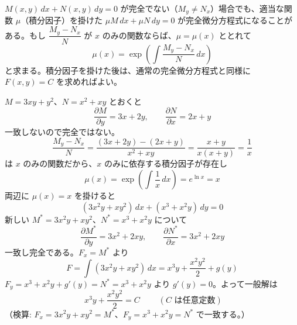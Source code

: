 
$M(x,y)\,dx + N(x,y)\,dy = 0$ が完全でない（$M_y \neq N_x$）場合でも、適当な関数 $\mu$（積分因子）を掛けた $\mu M\,dx + \mu N\,dy = 0$ が完全微分方程式になることがある。もし $\dfrac{M_y - N_x}{N}$ が $x$ のみの関数ならば、$\mu = \mu(x)$ ととれて
\[
\mu(x) = \exp\left(\int \frac{M_y - N_x}{N}\,dx\right)
\]
と求まる。積分因子を掛けた後は、通常の完全微分方程式と同様に $F(x,y) = C$ を求めればよい。

$M = 3xy + y^{2}$、$N = x^{2} + xy$ とおくと
\[
\frac{\partial M}{\partial y} = 3x + 2y, \qquad \frac{\partial N}{\partial x} = 2x + y
\]
一致しないので完全ではない。
\[
\frac{M_y - N_x}{N} = \frac{(3x+2y)-(2x+y)}{x^{2}+xy} = \frac{x+y}{x(x+y)} = \frac{1}{x}
\]
は $x$ のみの関数だから、$x$ のみに依存する積分因子が存在し
\[
\mu(x) = \exp\left(\int \frac{1}{x}\,dx\right) = e^{\ln x} = x
\]
両辺に $\mu(x) = x$ を掛けると
\[
(3x^{2}y + xy^{2})\,dx + (x^{3} + x^{2}y)\,dy = 0
\]
新しい $M^{*} = 3x^{2}y + xy^{2}$、$N^{*} = x^{3} + x^{2}y$ について
\[
\frac{\partial M^{*}}{\partial y} = 3x^{2} + 2xy, \qquad \frac{\partial N^{*}}{\partial x} = 3x^{2} + 2xy
\]
一致し完全である。$F_x = M^{*}$ より
\[
F = \int (3x^{2}y + xy^{2})\,dx = x^{3}y + \frac{x^{2}y^{2}}{2} + g(y)
\]
$F_y = x^{3} + x^{2}y + g'(y) = N^{*} = x^{3} + x^{2}y$ より $g'(y) = 0$。よって一般解は
\[
\boxed{\; x^{3}y + \frac{x^{2}y^{2}}{2} = C \;}
\qquad (C \text{ は任意定数})
\]
（検算: $F_x = 3x^{2}y + xy^{2} = M^{*}$、$F_y = x^{3} + x^{2}y = N^{*}$ で一致する。）

